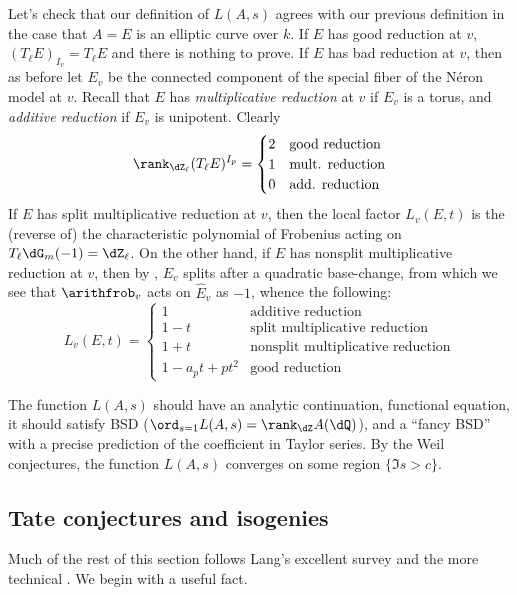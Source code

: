 Let's check that our definition of $L(A,s)$ agrees with our previous definition 
in the case that $A=E$ is an elliptic curve over $k$. If $E$ has good reduction 
at $v$, $(T_\ell E)_{I_v}=T_\ell E$ and there is nothing to prove. If $E$ has 
bad reduction at $v$, then as before let $E_v$ be the connected component 
of the special fiber of the N\'eron model at $v$. Recall that $E$ has 
\emph{multiplicative reduction} at $v$ if $E_v$ is a torus, and \emph{additive 
reduction} if $E_v$ is unipotent. Clearly  
\[
  \rank_{\dZ_\ell} (T_\ell E)^{I_p}
  =
  \begin{cases}
    2 & \text{good reduction} \\
    1 & \text{mult. reduction} \\
    0 & \text{add. reduction}
  \end{cases}
\]
If $E$ has split multiplicative reduction at $v$, then the local factor 
$L_v(E,t)$ is the (reverse of) the characteristic polynomial of Frobenius 
acting on $T_\ell \dG_m(-1) = \dZ_\ell$. On the other hand, if $E$ has 
nonsplit multiplicative reduction at $v$, then by \cite[III,2.5]{si06}, 
$E_v$ splits after a quadratic base-change, from which we see that 
$\arithfrob_v$ acts on $\widehat E_v$ as $-1$, whence the following: 
\[
  L_v(E,t) = 
    \begin{cases}
      1 & \text{additive reduction} \\
      1-t & \text{split multiplicative reduction} \\
      1+t & \text{nonsplit multiplicative reduction} \\
      1 - a_p t + p t^2 & \text{good reduction} 
    \end{cases}
\]

The function $L(A,s)$ should have an analytic continuation, functional equation, 
it should satisfy BSD ($\ord_{s=1} L(A,s) = \rank_\dZ A(\dQ)$), and a ``fancy BSD'' 
with a precise prediction of the coefficient in Taylor series. 
By the Weil conjectures, the function $L(A,s)$ converges on some region 
$\{\Im s>c\}$. 





\subsection{Tate conjectures and isogenies}

Much of the rest of this section follows Lang's excellent survey 
\cite{la91} and the more technical \cite{fa84}. We begin with a useful fact. 

